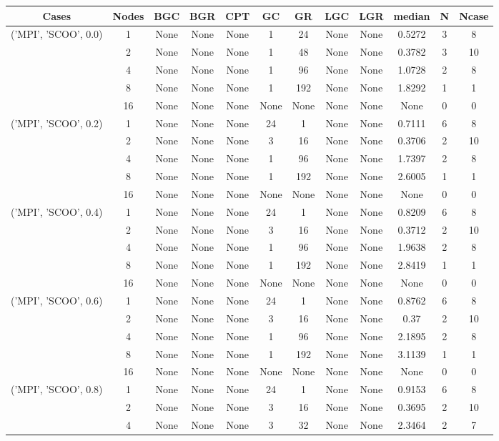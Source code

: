 \begin{tabular}{cccccccccccc}
\hline
Cases & Nodes& BGC& BGR& CPT& GC& GR& LGC& LGR& median & N & Ncase \\
\hline
\multirow{5}{*}{('MPI', 'SCOO', 0.0)}& 1& None& None& None& 1& 24& None& None& 0.5272& 3& 8\\
& 2& None& None& None& 1& 48& None& None& 0.3782& 3& 10\\
& 4& None& None& None& 1& 96& None& None& 1.0728& 2& 8\\
& 8& None& None& None& 1& 192& None& None& 1.8292& 1& 1\\
& 16& None& None& None& None& None& None& None& None& 0& 0\\
\hline
\multirow{5}{*}{('MPI', 'SCOO', 0.2)}& 1& None& None& None& 24& 1& None& None& 0.7111& 6& 8\\
& 2& None& None& None& 3& 16& None& None& 0.3706& 2& 10\\
& 4& None& None& None& 1& 96& None& None& 1.7397& 2& 8\\
& 8& None& None& None& 1& 192& None& None& 2.6005& 1& 1\\
& 16& None& None& None& None& None& None& None& None& 0& 0\\
\hline
\multirow{5}{*}{('MPI', 'SCOO', 0.4)}& 1& None& None& None& 24& 1& None& None& 0.8209& 6& 8\\
& 2& None& None& None& 3& 16& None& None& 0.3712& 2& 10\\
& 4& None& None& None& 1& 96& None& None& 1.9638& 2& 8\\
& 8& None& None& None& 1& 192& None& None& 2.8419& 1& 1\\
& 16& None& None& None& None& None& None& None& None& 0& 0\\
\hline
\multirow{5}{*}{('MPI', 'SCOO', 0.6)}& 1& None& None& None& 24& 1& None& None& 0.8762& 6& 8\\
& 2& None& None& None& 3& 16& None& None& 0.37& 2& 10\\
& 4& None& None& None& 1& 96& None& None& 2.1895& 2& 8\\
& 8& None& None& None& 1& 192& None& None& 3.1139& 1& 1\\
& 16& None& None& None& None& None& None& None& None& 0& 0\\
\hline
\multirow{5}{*}{('MPI', 'SCOO', 0.8)}& 1& None& None& None& 24& 1& None& None& 0.9153& 6& 8\\
& 2& None& None& None& 3& 16& None& None& 0.3695& 2& 10\\
& 4& None& None& None& 3& 32& None& None& 2.3464& 2& 7\\

\end{tabular}
